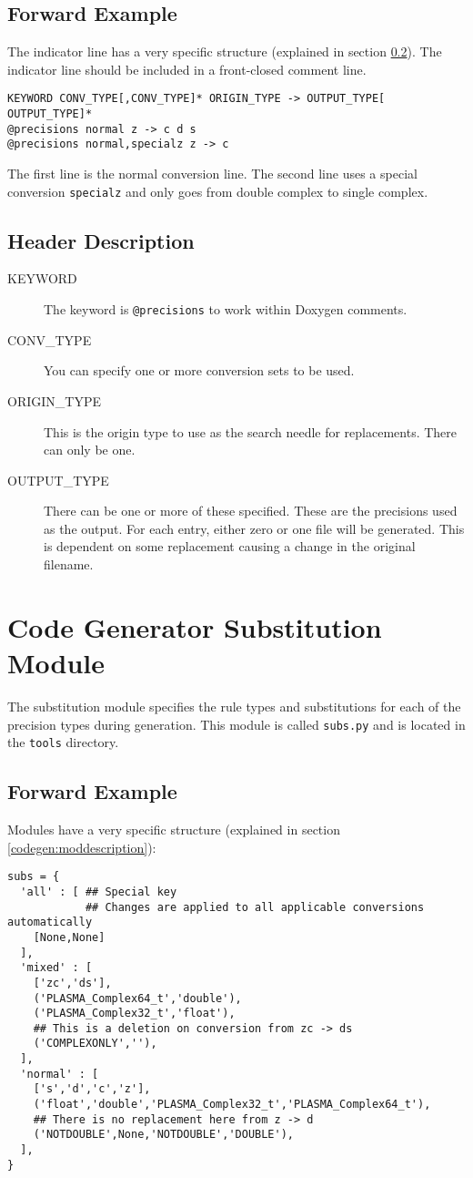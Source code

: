 \subsection{Forward Example}
The indicator line has a very specific structure
(explained in section \ref{codegen:headerdescription}).  The indicator line should be 
included in a front-closed comment line.
\begin{verbatim}
KEYWORD CONV_TYPE[,CONV_TYPE]* ORIGIN_TYPE -> OUTPUT_TYPE[ OUTPUT_TYPE]*
@precisions normal z -> c d s
@precisions normal,specialz z -> c
\end{verbatim}
The first line is the normal conversion line.  The second line uses a special conversion {\tt specialz}
and only goes from double complex to single complex.
\subsection{Header Description}
\label{codegen:headerdescription}
\begin{description}
\item[KEYWORD]
The keyword is {\tt @precisions} to work within Doxygen comments.
\item[CONV\_TYPE]
You can specify one or more conversion sets to be used.
\item[ORIGIN\_TYPE]
This is the origin type to use as the search needle for replacements. There can only be one.
\item[OUTPUT\_TYPE]
There can be one or more of these specified.  These are the precisions used as the output.
For each entry, either zero or one file will be generated. This is dependent on some replacement
causing a change in the original filename.
\end{description}

\section{Code Generator Substitution Module}
\label{codegen:module}
The substitution module specifies the rule types and substitutions for each
of the precision types during generation.  This module is called {\tt subs.py}
and is located in the {\tt tools} directory.  
\subsection{Forward Example}
Modules have a very specific structure
(explained in section \ref{codegen:moddescription}):
\begin{verbatim}
subs = {
  'all' : [ ## Special key
            ## Changes are applied to all applicable conversions automatically
    [None,None]
  ],
  'mixed' : [
    ['zc','ds'],
    ('PLASMA_Complex64_t','double'),
    ('PLASMA_Complex32_t','float'),
    ## This is a deletion on conversion from zc -> ds
    ('COMPLEXONLY',''), 
  ],
  'normal' : [
    ['s','d','c','z'],
    ('float','double','PLASMA_Complex32_t','PLASMA_Complex64_t'),
    ## There is no replacement here from z -> d
    ('NOTDOUBLE',None,'NOTDOUBLE','DOUBLE'), 
  ],
}
\end{verbatim}


